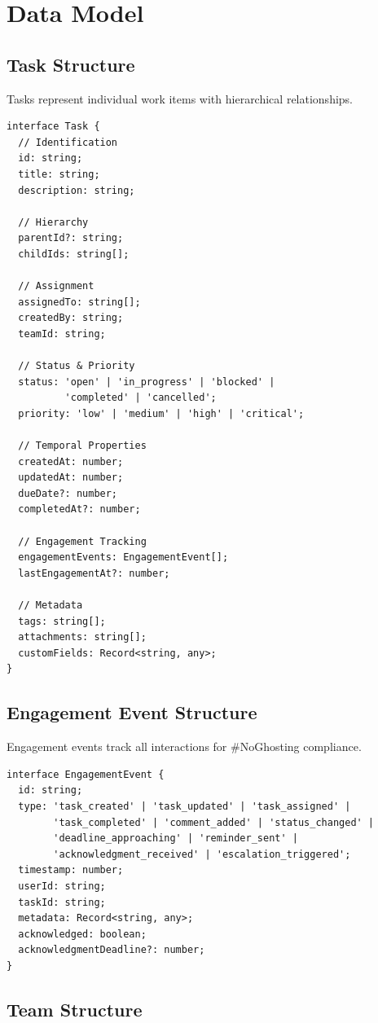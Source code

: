 \documentclass[12pt,a4paper]{article}
\begin{document}
\section{Data Model}

\subsection{Task Structure}

Tasks represent individual work items with hierarchical relationships.

\begin{lstlisting}
interface Task {
  // Identification
  id: string;
  title: string;
  description: string;

  // Hierarchy
  parentId?: string;
  childIds: string[];

  // Assignment
  assignedTo: string[];
  createdBy: string;
  teamId: string;

  // Status & Priority
  status: 'open' | 'in_progress' | 'blocked' |
          'completed' | 'cancelled';
  priority: 'low' | 'medium' | 'high' | 'critical';

  // Temporal Properties
  createdAt: number;
  updatedAt: number;
  dueDate?: number;
  completedAt?: number;

  // Engagement Tracking
  engagementEvents: EngagementEvent[];
  lastEngagementAt?: number;

  // Metadata
  tags: string[];
  attachments: string[];
  customFields: Record<string, any>;
}
\end{lstlisting}

\subsection{Engagement Event Structure}

Engagement events track all interactions for \#NoGhosting compliance.

\begin{lstlisting}
interface EngagementEvent {
  id: string;
  type: 'task_created' | 'task_updated' | 'task_assigned' |
        'task_completed' | 'comment_added' | 'status_changed' |
        'deadline_approaching' | 'reminder_sent' |
        'acknowledgment_received' | 'escalation_triggered';
  timestamp: number;
  userId: string;
  taskId: string;
  metadata: Record<string, any>;
  acknowledged: boolean;
  acknowledgmentDeadline?: number;
}
\end{lstlisting}

\subsection{Team Structure}
\end{document}
